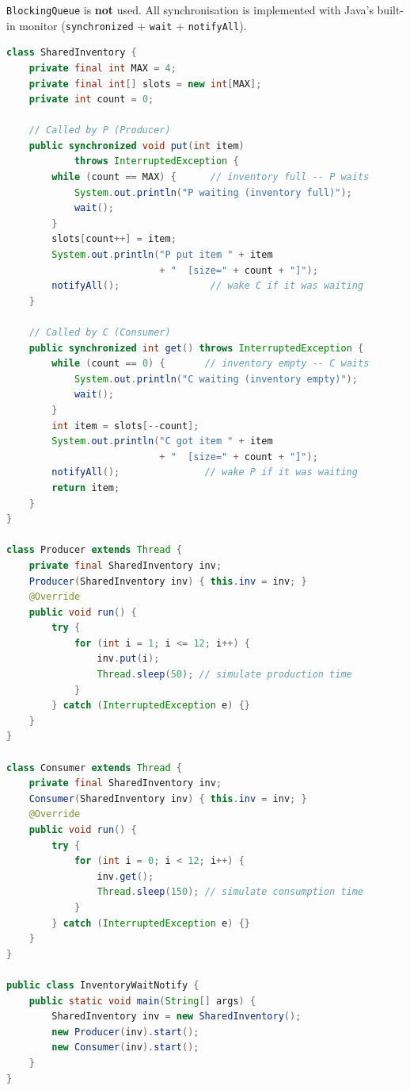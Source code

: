 \documentclass[12pt,a3paper]{article}
\begin{document}
\begin{enumerate}
\begin{tcolorbox}
\texttt{BlockingQueue} is \textbf{not} used.  All synchronisation is
implemented with Java's built-in monitor (\texttt{synchronized} +
\texttt{wait} + \texttt{notifyAll}).

\begin{lstlisting}[language=Java]
class SharedInventory {
    private final int MAX = 4;
    private final int[] slots = new int[MAX];
    private int count = 0;

    // Called by P (Producer)
    public synchronized void put(int item)
            throws InterruptedException {
        while (count == MAX) {      // inventory full -- P waits
            System.out.println("P waiting (inventory full)");
            wait();
        }
        slots[count++] = item;
        System.out.println("P put item " + item
                           + "  [size=" + count + "]");
        notifyAll();                // wake C if it was waiting
    }

    // Called by C (Consumer)
    public synchronized int get() throws InterruptedException {
        while (count == 0) {       // inventory empty -- C waits
            System.out.println("C waiting (inventory empty)");
            wait();
        }
        int item = slots[--count];
        System.out.println("C got item " + item
                           + "  [size=" + count + "]");
        notifyAll();               // wake P if it was waiting
        return item;
    }
}

class Producer extends Thread {
    private final SharedInventory inv;
    Producer(SharedInventory inv) { this.inv = inv; }
    @Override
    public void run() {
        try {
            for (int i = 1; i <= 12; i++) {
                inv.put(i);
                Thread.sleep(50); // simulate production time
            }
        } catch (InterruptedException e) {}
    }
}

class Consumer extends Thread {
    private final SharedInventory inv;
    Consumer(SharedInventory inv) { this.inv = inv; }
    @Override
    public void run() {
        try {
            for (int i = 0; i < 12; i++) {
                inv.get();
                Thread.sleep(150); // simulate consumption time
            }
        } catch (InterruptedException e) {}
    }
}

public class InventoryWaitNotify {
    public static void main(String[] args) {
        SharedInventory inv = new SharedInventory();
        new Producer(inv).start();
        new Consumer(inv).start();
    }
}
\end{lstlisting}


\end{tcolorbox}
\end{enumerate}
\end{document}
